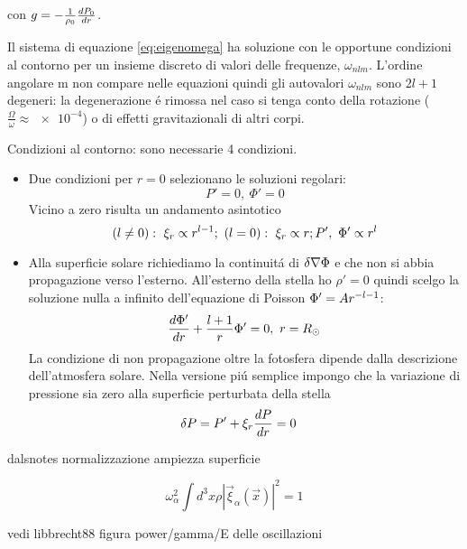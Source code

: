 \documentclass[../main.tex]{subfiles}
\begin{document}
con $g=-\frac{1}{\rho_0}\TDy{r}{P_0}$.

Il sistema di equazione \eqref{eq:eigenomega} ha soluzione con le opportune condizioni al contorno per un insieme discreto di valori delle frequenze, $\omega_{nlm}$. L'ordine angolare m non compare nelle equazioni quindi gli autovalori $\omega_{nlm}$ sono $2l+1$ degeneri: la degenerazione \'e rimossa nel caso si tenga conto della rotazione ($\frac{\Omega}{\omega}\approx\num{e-4}$) o di effetti gravitazionali di altri corpi.

Condizioni al contorno: sono necessarie 4 condizioni.
\begin{itemize}
\item Due condizioni per $r=0$ selezionano le soluzioni regolari:
\begin{equation}
P'=0,\ \Phi'=0
\end{equation}
Vicino a zero risulta un andamento asintotico
\begin{equation}
(l\neq0):\ \xi_r\propto r\expy{l-1};\ (l=0):\ \xi_r\propto r;P',\ \Phi'\propto r^l
\end{equation}

\item Alla superficie solare richiediamo la continuit\'a di $\Lvar{\nabla\Phi}$ e che non si abbia propagazione verso l'esterno.
All'esterno della stella ho $\rho'=0$ quindi scelgo la soluzione nulla a infinito dell'equazione di Poisson $\Phi'=Ar\expy{-l-1}$:
\begin{equation}
\TDy{r}{\Phi'}+\frac{l+1}{r}\Phi'=0,\ r=\rsun{}    
\end{equation}
La condizione di non propagazione oltre la fotosfera dipende dalla descrizione dell'atmosfera solare. Nella versione pi\'u semplice impongo che la variazione di pressione sia zero alla superficie perturbata della stella
\begin{align}
&\Lvar{P}=P'+\xi_r\TDy{r}{P}=0
\end{align}
\end{itemize}

\begin{workout}[normalizzazione]

dalsnotes normalizzazione ampiezza superficie

\begin{equation}
\omega_{\alpha}^2\int d^3x\rho|\vec{\xi}_{\alpha}(\vec{x})|^2=1
\end{equation}

vedi libbrecht88 figura power/gamma/E delle oscillazioni

\end{workout}
\end{document}
